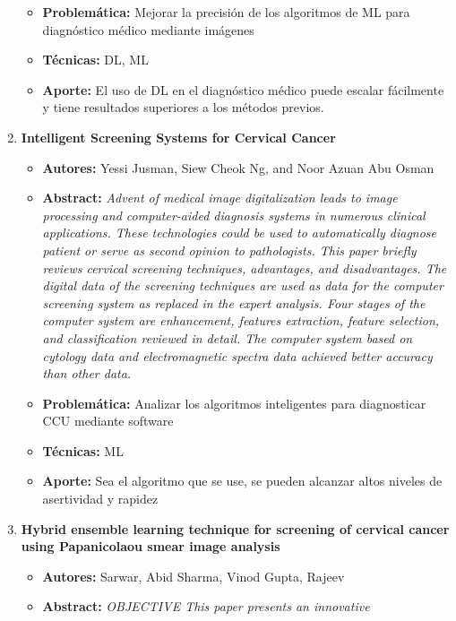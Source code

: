 \begin{enumerate}[label=\textbf{\arabic*}]
\begin{itemize}
        \item{\textbf{Problemática:}} Mejorar la precisión de los algoritmos de
        ML para diagnóstico médico mediante imágenes
        \item{\textbf{Técnicas:}} DL, ML
        \item{\textbf{Aporte:}} El uso de DL en el diagnóstico médico
        puede escalar fácilmente y tiene resultados superiores a los métodos previos.
    \end{itemize}
    \item \textbf{Intelligent Screening Systems for Cervical Cancer}~\cite{Jusman2014}
    \begin{itemize} 
        \item{\textbf{Autores:}} Yessi Jusman, Siew Cheok Ng, and Noor Azuan Abu
        Osman
        \item{\textbf{Abstract:}} \textit{Advent of medical image digitalization leads to 
        image processing and computer-aided diagnosis systems in numerous clinical applications.
         These technologies could be used to automatically diagnose patient or serve as second opinion
          to pathologists. This paper briefly reviews cervical screening techniques, advantages, and disadvantages. 
          The digital data of the screening techniques are used as data for the computer screening system as replaced 
          in the expert analysis. Four stages of the computer system are enhancement, features extraction, feature selection,
           and classification reviewed in detail. The computer system based on cytology data and electromagnetic spectra data
            achieved better accuracy than other data.}
        \item{\textbf{Problemática:}} Analizar los algoritmos inteligentes
        para diagnosticar CCU mediante software
        \item{\textbf{Técnicas:}} ML
        \item{\textbf{Aporte:}} Sea el algoritmo que se use, se pueden alcanzar
        altos niveles de asertividad y rapidez
    \end{itemize}
    \item \textbf{Hybrid ensemble learning technique for screening of cervical cancer using Papanicolaou smear image analysis}~\cite{Sarwar2015}
    \begin{itemize} 
        \item{\textbf{Autores:}} Sarwar, Abid Sharma, Vinod Gupta, Rajeev
        \item{\textbf{Abstract:}} \textit{OBJECTIVE This paper presents an innovative 
}
\end{itemize}
\end{enumerate}

